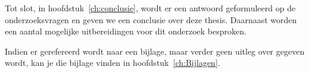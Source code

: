 
Tot slot, in hoofdstuk~\ref{ch:conclusie}, wordt er een antwoord geformuleerd op de onderzoeksvragen en geven we een conclusie over deze thesis. Daarnaast worden een aantal mogelijke uitbereidingen voor dit onderzoek besproken.


Indien er gerefereerd wordt naar een bijlage, maar verder geen uitleg over gegeven wordt, kan je die bijlage vinden in hoofdstuk~\ref{ch:Bijlagen}.
